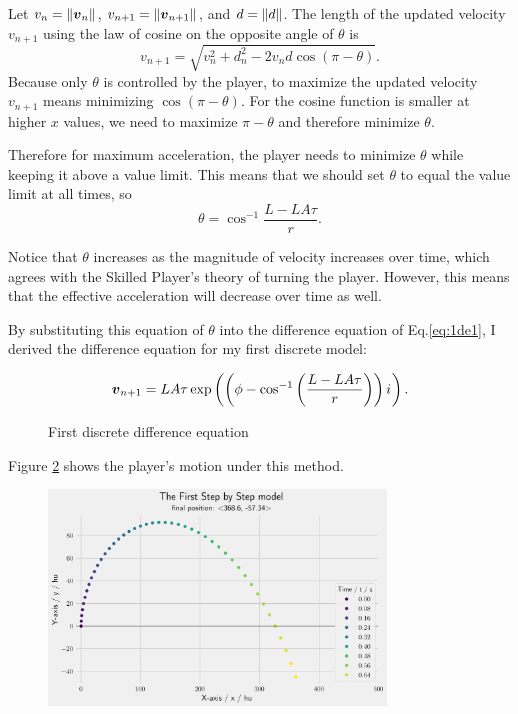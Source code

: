 Let $v_n = \|\boldsymbol{v}_n\|$, $v_{n+1} = \|\boldsymbol{v}_{n+1}\|$, and $d = \|d\|$. The length of the updated velocity $v_{n+1}$ using the law of cosine on the opposite angle of $\theta$ is
\[
    v_{n+1} = \sqrt{v_n^2 + d_n^2 - 2 v_n d\cos (\pi - \theta)}.
\]
Because only $\theta$ is controlled by the player, to maximize the updated velocity $v_{n+1}$ means minimizing $\cos(\pi - \theta)$. For the cosine function is smaller at higher $x$ values, we need to maximize $\pi - \theta$ and therefore minimize $\theta$.

Therefore for maximum acceleration, the player needs to minimize $\theta$ while keeping it above a value limit. This means that we should set $\theta$ to equal the value limit at all times, so
\[
    \theta = \cos^{-1} \frac{L-LA\tau}{r}.
\]

Notice that $\theta$ increases as the magnitude of velocity increases over time, which agrees with the Skilled Player's theory of turning the player. However, this means that the effective acceleration will decrease over time as well.

By substituting this equation of $\theta$ into the difference equation of Eq.\ref{eq:1de1}, I derived the difference equation for my first discrete model:
\begin{figure}[H]
    \centering
    \[
        \boldsymbol{v}_{n+1} = LA\tau \exp\left(\left(\phi - \cos^{-1}\left(\frac{L-LA\tau}{r}\right)\right) {i\mkern1mu}\right).
    \]
    \caption{First discrete difference equation}
    \label{fig:sbs}
\end{figure}

Figure \ref{fig:1sbs} shows the player's motion under this method.

\begin{figure}[H]
    \centering
    \includegraphics[width=0.8\textwidth]{assets/step_by_step_1.png}
    \caption{}
    \label{fig:1sbs}
\end{figure}

